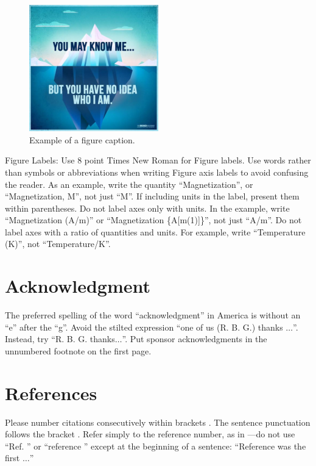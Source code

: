 \documentclass[conference]{IEEEtran}
\begin{document}
\begin{figure}[htbp]
\centerline{\includegraphics[width=0.5\textwidth,natwidth=400,natheight=300]{fig1.png}}
\caption{Example of a figure caption.}
\label{fig}
\end{figure}

Figure Labels: Use 8 point Times New Roman for Figure labels. Use words 
rather than symbols or abbreviations when writing Figure axis labels to 
avoid confusing the reader. As an example, write the quantity 
``Magnetization'', or ``Magnetization, M'', not just ``M''. If including 
units in the label, present them within parentheses. Do not label axes only 
with units. In the example, write ``Magnetization (A/m)'' or ``Magnetization 
\{A[m(1)]\}'', not just ``A/m''. Do not label axes with a ratio of 
quantities and units. For example, write ``Temperature (K)'', not 
``Temperature/K''.

\section*{Acknowledgment}

The preferred spelling of the word ``acknowledgment'' in America is without 
an ``e'' after the ``g''. Avoid the stilted expression ``one of us (R. B. 
G.) thanks $\ldots$''. Instead, try ``R. B. G. thanks$\ldots$''. Put sponsor 
acknowledgments in the unnumbered footnote on the first page.

\section*{References}

Please number citations consecutively within brackets \cite{b1}. The 
sentence punctuation follows the bracket \cite{b2}. Refer simply to the reference 
number, as in \cite{b3}---do not use ``Ref. \cite{b3}'' or ``reference \cite{b3}'' except at 
the beginning of a sentence: ``Reference \cite{b3} was the first $\ldots$''
\end{document}
